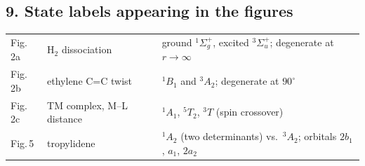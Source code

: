 \subsection*{9. State labels appearing in the figures}
\begin{tabular}{lll}
  Fig.\,2a & H$_2$ dissociation & ground ${}^1\Sigma_g^+$, excited ${}^3\Sigma_u^+$; degenerate at $r\to\infty$\\
  Fig.\,2b & ethylene C=C twist & ${}^1B_1$ and ${}^3A_2$; degenerate at $90^\circ$\\
  Fig.\,2c & TM complex, M--L distance & ${}^1A_1$, ${}^5T_2$, ${}^3T$ (spin crossover)\\
  Fig.\,5  & tropylidene & ${}^1A_2$ (two determinants) vs.\ ${}^3A_2$; orbitals $2b_1$, $a_1$, $2a_2$\\
\end{tabular}


